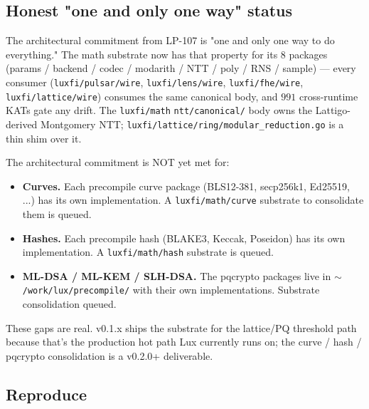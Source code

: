 \subsection{Honest "one and only one way" status}

The architectural commitment from LP-107 is "one and only one way to
do everything." The math substrate now has that property for its 8
packages (params / backend / codec / modarith / NTT / poly / RNS /
sample) — every consumer (\texttt{luxfi/pulsar/wire},
\texttt{luxfi/lens/wire}, \texttt{luxfi/fhe/wire},
\texttt{luxfi/lattice/wire}) consumes the same canonical body, and
$991$ cross-runtime KATs gate any drift. The \texttt{luxfi/math}
\texttt{ntt/canonical/} body owns the Lattigo-derived Montgomery NTT;
\texttt{luxfi/lattice/ring/modular\_reduction.go} is a thin shim
over it.

The architectural commitment is NOT yet met for:
\begin{itemize}[nosep,leftmargin=2em]
\item \textbf{Curves.} Each precompile curve package
(BLS12-381, secp256k1, Ed25519, ...) has its own implementation. A
\texttt{luxfi/math/curve} substrate to consolidate them is queued.
\item \textbf{Hashes.} Each precompile hash (BLAKE3, Keccak, Poseidon)
has its own implementation. A \texttt{luxfi/math/hash} substrate is queued.
\item \textbf{ML-DSA / ML-KEM / SLH-DSA.} The pqcrypto packages live
in \texttt{$\sim$/work/lux/precompile/} with their own implementations.
Substrate consolidation queued.
\end{itemize}

These gaps are real. v0.1.x ships the substrate for the lattice/PQ
threshold path because that's the production hot path Lux currently
runs on; the curve / hash / pqcrypto consolidation is a v0.2.0+
deliverable.

\subsection{Reproduce}

